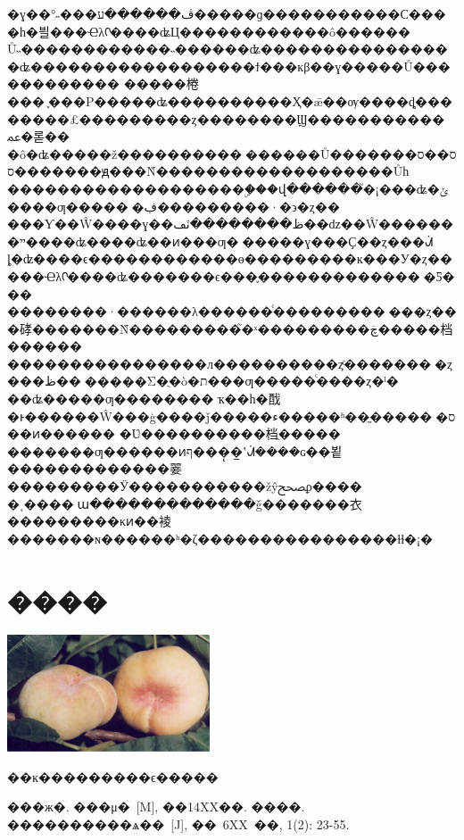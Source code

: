 \documentclass[a4paper,UTF8]{ctexart} %
\makeatletter
\newenvironment{figurehere}
  {\def\@captype{figure}}
  {}
\makeatother
\begin{document}
\begin{CJK*}{GBK}{song}
\begin{multicols}{2}
�ɣ��°˶���ڤ������ע�����ɡ�����������С���񣬾�һ�븰���Ҽλᡣ����ʥЦ������������ô������
Ů˵������������˵������ʥ����������������ʥ������������������ϯ���кβ��ɣ�����Ů������������
�����棬���᲻֪���Ρ�����ʥ����������Ҳ�ǣ��ѹ����ȡ��������£���������ȥ��������Ϣ�����������ﲻ�롣��
�ô�ʥ�����ž����������������Ů������ס��ס��ס������ԭ���Ǹ�������������������Ůһ
�������������������ۣ���վ������֮�¡���ʥ�ݶ����ƣ�����԰�ڣ���������·�϶�ȥ��\\
\indent ���Ƴ��Ŵ����ɣ��ظ��������ٽڡ��ǳ��Ŵ�������ײ����ʥ����ʥ��ͷ���ƣ�׬�����ɣ���Ҫ��ȥ���ᣬ
ȴ�ʣ����ϵ������������ɵ���������ĸ���У�ȥ�����Ҽλᡣ����ʥ�������ϵ���֪��������������Ƽ���
��������·������λ������ͨ���������񣬺���ȥ���硣�������Ǹ���������֮�ˣ���������ڿ�����档������
����������������л����������ȥͨ�������񣬷�ȥ���ظ��᣿�����Σ�ֻ�ò�ת���ƣ�����ͨ����ȥ�ˡ�\\
\indent ��ʥ�����ƣ��������ҡ��һ�䣬�ͱ������Ŵ���ģ����ǰ�����ء�����ʱ��ֱ�����󣬰�ס��ͷ������
�Ʋ����������档ֻ�����
�������ƣ������ͷף���̨�̲ʽᣬ����ɢ��뵡�������������翣���������Ӱ�����������žŷﵤϼ����
�˱����޶ա�������������ǧ�������衣���������κͷ��裬�������ɴ������ʰ�ζ����������������ɫɫ�¡�
\section{����}
\begin{figurehere}
\centering
\includegraphics[width=6cm]{Pantao.jpg}
\caption{��ĸ���������ϵ�����}\label{fig2}
\end{figurehere}
\small
\begin{thebibliography}{99}
\setlength{\parskip}{0pt}  %
���ж�. ���μ�~[M], ��14XX��.
 ����. ����������ѧ��~[J], ��~6XX~��, 1(2): 23-55.


\end{thebibliography}
\end{multicols}
\end{CJK*}
\end{document}
